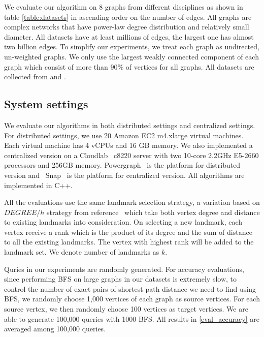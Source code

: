 We evaluate our algorithm on 8 graphs from different disciplines as shown in table \ref{table:datasets} in ascending order on the number of edges. All graphs are complex networks that have power-law degree distribution and relatively small diameter. All datasets have at least millions of edges, the largest one has almost two billion edges. To simplify our experiments, we treat each graph as undirected, un-weighted graphs. We only use the largest weakly connected component of each graph which consist of more than $90\%$ of vertices for all graphs. All datasets are collected from \cite{snapnets} and \cite{nr}.

\subsection{System settings}
\label{eval_system}

We evaluate our algorithms in both distributed settings and centralized settings.
For distributed settings, we use 20 Amazon EC2 m4.xlarge virtual machines. Each virtual machine has 4 vCPUs and 16 GB memory. We also implemented a centralized version on a Cloudlab~\cite{RicciEide:login14} c8220 server with two 10-core 2.2GHz E5-2660 processors and 256GB memory. Powergraph~\cite{180251} is the platform for distributed version and ~Snap~\cite{snapnets} is the platform for centralized version. All algorithms are implemented in C++. 

All the evaluations use the same landmark selection strategy, a variation based on $DEGREE/h$ strategy from reference~\cite{Potamias:2009:FSP:1645953.1646063} which take both vertex degree and distance to existing landmarks into consideration. On selecting a new landmark, each vertex receive a rank which is the product of its degree and the sum of distance to all the existing landmarks. The vertex with highest rank will be added to the landmark set. We denote number of landmarks as $k$.

Quries in our experiments are randomly generated. For accuracy evaluations, since performing BFS on large graphs in our datasets is extremely slow, to control the number of exact pairs of shortest path distance we need to find using BFS, we randomly choose 1,000 vertices of each graph as source vertices. For each source vertex, we then randomly choose 100 vertices as target vertices. We are able to generate 100,000 queries with 1000 BFS. All results in \ref{eval_accuracy} are averaged among 100,000 queries.

